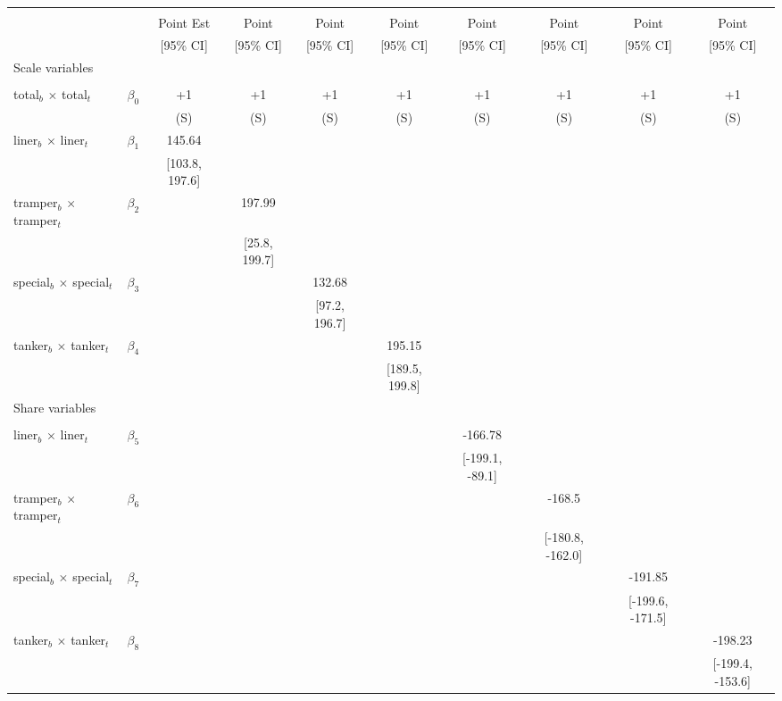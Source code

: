 \begin{tabular}{@{\extracolsep{5pt}}lccccccccc}
\toprule 
 &  &  &  &  &  &  &  &  &  \\
 &  & Point Est & Point & Point & Point & Point & Point & Point & Point \\
 &  & [95\% CI] & [95\% CI] & [95\% CI] & [95\% CI] & [95\% CI] & [95\% CI] & [95\% CI] & [95\% CI] \\
\midrule 
Scale variables &  &  &  &  &  &  &  \\
 &  &  &  &  &  &  &  &  \\
total$_{b}$ $\times$ total$_{t}$ & $\beta_0$ & +1 & +1 & +1 & +1 & +1 & +1 & +1 & +1 \\
 &  & (S) & (S) & (S) & (S) & (S) & (S) & (S) & (S) \\
liner$_{b}$ $\times$ liner$_{t}$ & $\beta_1$ & 145.64 &  &  &  &  &  &  &  \\
 &  & [103.8, 197.6] &  &  &  &  &  &  &  \\
tramper$_{b}$ $\times$ tramper$_{t}$ & $\beta_2$ &  & 197.99 &  &  &  &  &  &  \\
 &  &  & [25.8, 199.7] &  &  &  &  &  &  \\
special$_{b}$ $\times$ special$_{t}$ & $\beta_3$ &  &  & 132.68 &  &  &  &  &  \\
 &  &  &  & [97.2, 196.7] &  &  &  &  &  \\
tanker$_{b}$ $\times$ tanker$_{t}$ & $\beta_4$ &  &  &  & 195.15 &  &  &  &  \\
 &  &  &  &  & [189.5, 199.8] &  &  &  &  \\
Share variables &  &  &  &  &  &  &  &  &  \\
 &  &  &  &  &  &  &  &  &  \\
liner$_{b}$ $\times$ liner$_{t}$ & $\beta_5$ &  &  &  &  & -166.78 &  &  &  \\
 &  &  &  &  &  & [-199.1, -89.1] &  &  &  \\
tramper$_{b}$ $\times$ tramper$_{t}$ & $\beta_6$ &  &  &  &  &  & -168.5 &  &  \\
 &  &  &  &  &  &  & [-180.8, -162.0] &  &  \\
special$_{b}$ $\times$ special$_{t}$ & $\beta_7$ &  &  &  &  &  &  & -191.85 &  \\
 &  &  &  &  &  &  &  & [-199.6, -171.5] &  \\
tanker$_{b}$ $\times$ tanker$_{t}$ & $\beta_8$ &  &  &  &  &  &  &  & -198.23 \\
 &  &  &  &  &  &  &  &  & [-199.4, -153.6] \\

\end{tabular}
